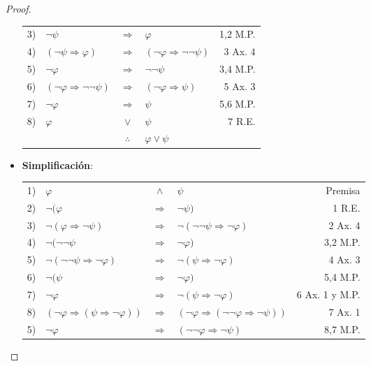 \documentclass[12pt]{report}
\newcounter{it}
\theoremstyle{largebreak}
\begin{document}
\begin{proof}
\begin{itemize}
\begin{center}
\begin{tabular}{l l c l r}
                    3) & $\neg\psi$ & $\Rightarrow$ & $\varphi$ & 1,2 M.P. \\
                    4) & $(\neg\psi\Rightarrow\varphi)$ & $\Rightarrow$ & $(\neg\varphi\Rightarrow\neg\neg\psi)$ & 3 Ax. 4 \\
                    5) & $\neg\varphi$ & $\Rightarrow$ & $\neg\neg\psi$ & 3,4 M.P. \\
                    6) & $(\neg\varphi\Rightarrow\neg\neg\psi)$ & $\Rightarrow$ & $(\neg\varphi\Rightarrow\psi)$ & 5 Ax. 3 \\
                    7) & $\neg\varphi$ & $\Rightarrow$ & $\psi$ & 5,6 M.P. \\
                    8) & $\varphi$ & $\lor$ & $\psi$ & 7 R.E. \\
                    \hline
                    & & $\therefore$ & $\varphi\lor\psi$ & \\
                \end{tabular}
            \end{center}
            \item \textbf{Simplificación}:
            \begin{center}
                \begin{tabular}{l l c l r}
                    1) & $\varphi$ & $\land$ & $\psi$ & Premisa \\
                    2) & $\neg(\varphi$ & $\Rightarrow$ & $\neg\psi)$ & 1 R.E. \\
                    3) & $\neg(\varphi\Rightarrow\neg\psi)$ & $\Rightarrow$ & $\neg(\neg\neg\psi\Rightarrow\neg\varphi)$ & 2 Ax. 4 \\
                    4) & $\neg(\neg\neg\psi$ & $\Rightarrow$ & $\neg\varphi)$ & 3,2 M.P. \\
                    5) & $\neg(\neg\neg\psi\Rightarrow\neg\varphi)$ & $\Rightarrow$ & $\neg(\psi\Rightarrow\neg\varphi)$ & 4 Ax. 3 \\
                    6) & $\neg(\psi$ & $\Rightarrow$ & $\neg\varphi)$ & 5,4 M.P. \\
                    7) & $\neg\varphi$ & $\Rightarrow$ & $\neg(\psi\Rightarrow\neg\varphi)$ & 6 Ax. 1 y M.P. \\
                    8) & $(\neg\varphi\Rightarrow(\psi\Rightarrow\neg\varphi))$ & $\Rightarrow$ & $(\neg\varphi\Rightarrow(\neg\neg\varphi\Rightarrow\neg\psi))$ & 7 Ax. 1 \\
                    5) & $\neg\varphi$ & $\Rightarrow$ & $(\neg\neg\varphi\Rightarrow\neg\psi)$ & 8,7 M.P. \\

\end{tabular}
\end{center}
\end{itemize}
\end{proof}
\end{document}
